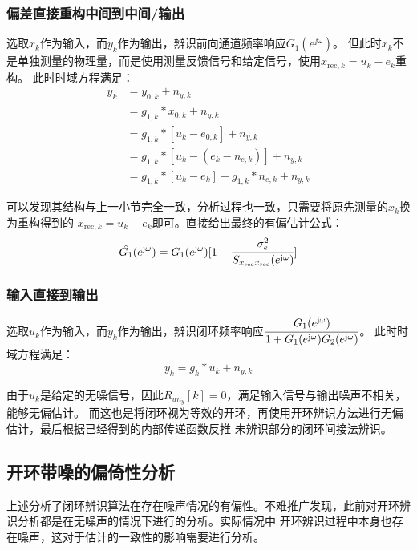 \subsubsection{偏差直接重构中间到中间/输出\label{sec:偏差直接重构中间到中间/输出的偏倚性分析}}
选取\(x_k\)作为输入，而\(y_k\)作为输出，辨识前向通道频率响应\(G_1(e^{\jj\omega})\)。
但此时\(x_k\)不是单独测量的物理量，而是使用测量反馈信号和给定信号，使用\(x_{\mathrm{rec},k}=u_k-e_k\)重构。
此时时域方程满足：
\begin{align*}
    y_k&=y_{0,k}+n_{y,k}\\
    &=g_{1,k}*x_{0,k}+n_{y,k}\\
    &=g_{1,k}*[u_k-e_{0,k}]+n_{y,k}\\
    &=g_{1,k}*[u_k-(e_k-n_{e,k})]+n_{y,k}\\
    &=g_{1,k}*[u_k-e_k]+g_{1,k}*n_{e,k}+n_{y,k}
\end{align*}

可以发现其结构与上一小节完全一致，分析过程也一致，只需要将原先测量的\(x_k\)换为重构得到的
\(x_{\mathrm{rec},k}=u_k-e_k\)即可。直接给出最终的有偏估计公式：
\begin{equation*}
    \hat{G_1}(e^{\mathrm{j}\omega})=G_1(e^{\mathrm{j}\omega})[1-\cfrac{\sigma_e^2}{S_{x_{\mathrm{rec}}x_{\mathrm{rec}}}(e^{\mathrm{j}\omega})}]
\end{equation*}

\subsubsection{输入直接到输出\label{sec:输入直接到输出}}
选取\(u_k\)作为输入，而\(y_k\)作为输出，辨识闭环频率响应\(\cfrac{G_1(e^{\mathrm{j}\omega})}{1+G_1(e^{\mathrm{j}\omega})G_2(e^{\mathrm{j}\omega})}\)。
此时时域方程满足：
\begin{equation*}
    y_k = g_k*u_k + n_{y,k}
\end{equation*}

由于\(u_k\)是给定的无噪信号，因此\(R_{un_y}[k]=0\)，满足输入信号与输出噪声不相关，能够无偏估计。
而这也是将闭环视为等效的开环，再使用开环辨识方法进行无偏估计，最后根据已经得到的内部传递函数反推
未辨识部分的闭环间接法辨识。

\subsection{开环带噪的偏倚性分析\label{sec:开环带噪的偏倚性分析}}
上述分析了闭环辨识算法在存在噪声情况的有偏性。不难推广发现，此前对开环辨识分析都是在无噪声的情况下进行的分析。实际情况中
开环辨识过程中本身也存在噪声，这对于估计的一致性的影响需要进行分析。

